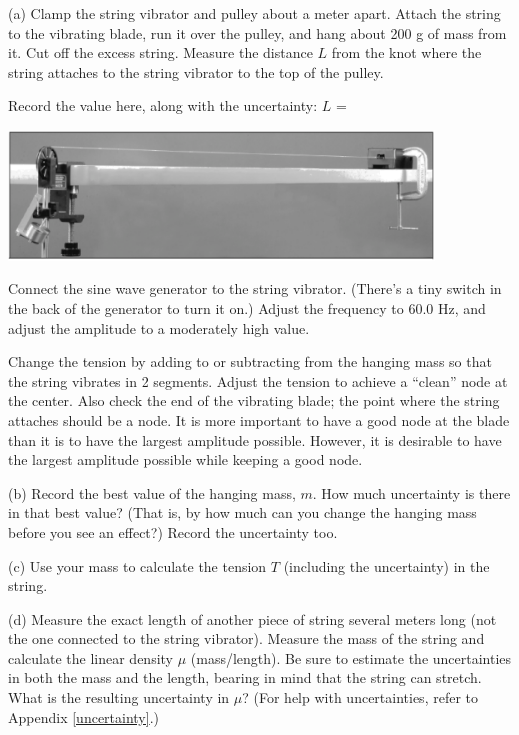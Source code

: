 (a) Clamp the string vibrator and pulley about a meter apart. Attach the string to the vibrating blade, run it over the pulley, and hang about 200 g of mass from it. Cut off the excess string. Measure the distance $L$ from the knot where the string attaches to the string vibrator to the top of the pulley.

Record the value here, along with the uncertainty: $L$ =

\vspace{0.5cm}
\begin{center}
\includegraphics[width=320pt]{standing_waves_strings/standing_waves_strings_fig3_tb.eps}
\end{center}

Connect the sine wave generator to the string vibrator. (There's a tiny switch in the back of the generator to turn it on.)  Adjust the frequency to 60.0 Hz, and adjust the amplitude to a moderately high value.

Change the tension by adding to or subtracting from the hanging mass so that the string vibrates in 2 segments. Adjust the tension to achieve a ``clean'' node at the center. Also check the end of the vibrating blade; the point where the string attaches should be a node. It is more important to have a good node at the blade than it is to have the largest amplitude possible. However, it is desirable to have the largest amplitude possible while keeping a good node.

(b) Record the best value of the hanging mass, $m$. How much uncertainty is there in that best value? (That is, by how much can you change the hanging mass before you see an effect?) Record the uncertainty too.
\answerspace{2cm}

\pagebreak[2]

(c) Use your mass to calculate the tension $T$ (including the uncertainty) in the string.
\answerspace{2cm}

(d) Measure the exact length of another piece of string several meters long (not the one connected to the string vibrator). Measure the mass of the
string and calculate the linear density $\mu$ (mass/length).  
Be sure to estimate the uncertainties in both the mass and the length, bearing in mind that the string can stretch. What is the resulting uncertainty in $\mu$?  (For help with uncertainties, refer to Appendix \ref{uncertainty}.)
\answerspace{4.5cm}

